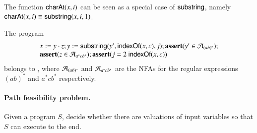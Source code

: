 \begin{remark}
The function ${\sf charAt}(x, i)$ can be seen as a special case of $\mathsf{substring}$, namely ${\sf charAt}(x, i) \equiv \mathsf{substring}(x, i, 1)$.
\end{remark}

\begin{example}
The program 
\[
\begin{array}{l}
x:= y \cdot z; y := \mathsf{substring}(y', \mathsf{indexOf}(x, c), j); \textbf{assert}(y' \in \mathcal{A}_{(ab)^*}); \\
\textbf{assert}(z \in \mathcal{A}_{a^* c b^*}); \textbf{assert}(j = 2\ \mathsf{indexOf}(x, c))
\end{array}
\] 
belongs to {\slint}, where $\mathcal{A}_{(ab)^*}$ and $\mathcal{A}_{a^* c b^*}$ are the NFAs for the regular expressions $(ab)^*$ and $a^* c b^*$ respectively.
\end{example}


\paragraph*{Path feasibility problem.} Given a {\slint} program $S$, decide whether there are valuations of input variables so that $S$ can execute to the end.

%

















